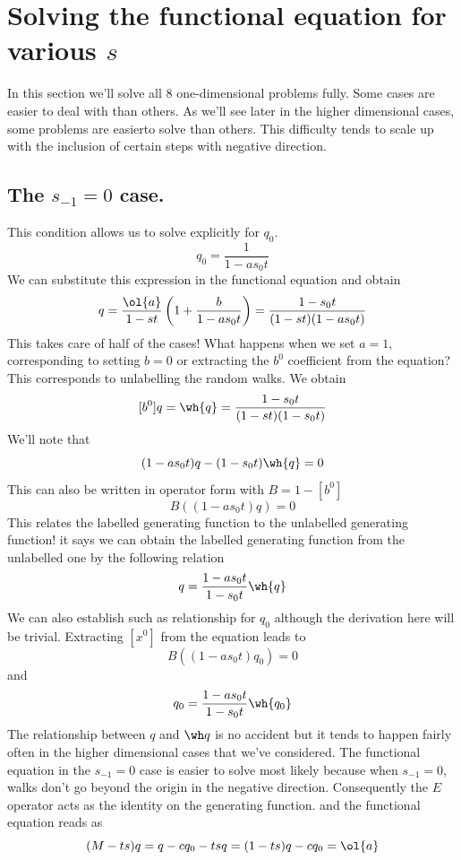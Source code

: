 \section{Solving the functional equation for various $s$}
\label{sec:Solving1D}
In this section we'll solve all 8 one-dimensional problems fully. Some cases are easier to deal with than others. As we'll see later in the higher dimensional cases, some problems are easierto solve than others. This difficulty tends to scale up with the inclusion of certain steps with negative direction.
\subsection{The $s_{-1} = 0$ case.}
This condition allows us to solve explicitly for $q_0$.
\[
	q_0 = \frac{1}{1-as_0t}
\]
We can substitute this expression in the functional equation and obtain
\[
	q =\frac{\ol{a}}{1-st}\left(1 + \frac{b}{{1-as_0t}}\right) = \frac{1-s_0t}{(1-st)(1-as_0t)}
\]
This takes care of half of the cases! What happens when we set $a = 1$, corresponding to setting $b =0$ or extracting the $b^0$ coefficient from the equation? This corresponds to unlabelling the random walks. We obtain
\[
	[b^0]q = \wh{q} =  \frac{1-s_0t}{(1-st)(1-s_0t)}
\]
We'll note that
\[
	(1-as_0t)q-(1-s_0t)\wh{q} = 0
\]
This can also be written in operator form with $B = 1 - [b^0]$
\[
	B((1-as_0t)q) = 0
\]
This relates the labelled generating function to the unlabelled generating function! it says we can obtain the labelled generating function from the unlabelled one by the following relation
\[
	q = \frac{1-as_0t}{1-s_0t}\wh{q}
\]
We can also establish such as relationship for $q_0$ although the derivation here will be trivial. Extracting $[x^0]$ from the equation leads to
\[
	B((1-as_0t)q_0) = 0
\]
and
\[
	q_0 = \frac{1-as_0t}{1-s_0t}\wh{q_0}
\]
The relationship between $q$ and $\wh q$ is no accident but it tends to happen fairly often in the higher dimensional cases that we've considered. The functional equation in the $s_{-1} = 0$ case is easier to solve most likely because when $s_{-1} = 0$, walks don't go beyond the origin in the negative direction. Consequently the $E$ operator acts as the identity on the generating function. and the functional equation reads as
\[
   (M-ts)q = q- cq_0 - tsq = (1-ts)q - c q_0 = \ol{a}
\]
